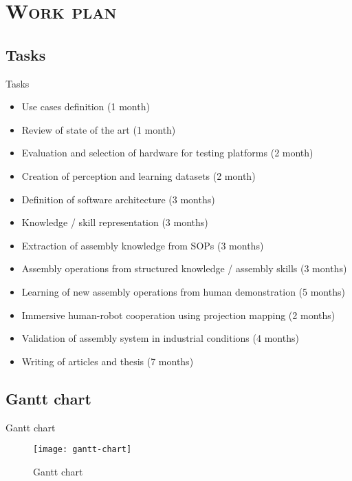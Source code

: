 \section{\scshape Work plan}\label{sec:workplan}

\subsection{Tasks}
\begin{frame}{Tasks}
	\begin{footnotesize}
		\begin{itemize}
			\item Use cases definition (1 month)
			\item Review of state of the art (1 month)
			\item Evaluation and selection of hardware for testing platforms (2 month)
			\item Creation of perception and learning datasets (2 month)
			\item Definition of software architecture (3 months)
			\item Knowledge / skill representation (3 months)
			\item Extraction of assembly knowledge from SOPs (3 months)
			\item Assembly operations from structured knowledge / assembly skills (3 months)
			\item Learning of new assembly operations from human demonstration (5 months)
			\item Immersive human-robot cooperation using projection mapping (2 months)
			\item Validation of assembly system in industrial conditions (4 months)
			\item Writing of articles and thesis (7 months)
		\end{itemize}
	\end{footnotesize}
\end{frame}

\subsection{Gantt chart}
\begin{frame}{Gantt chart}
	\begin{figure}
		\centering
		\texttt{[image: gantt-chart]}
		\caption{Gantt chart}
	\end{figure}
\end{frame}
